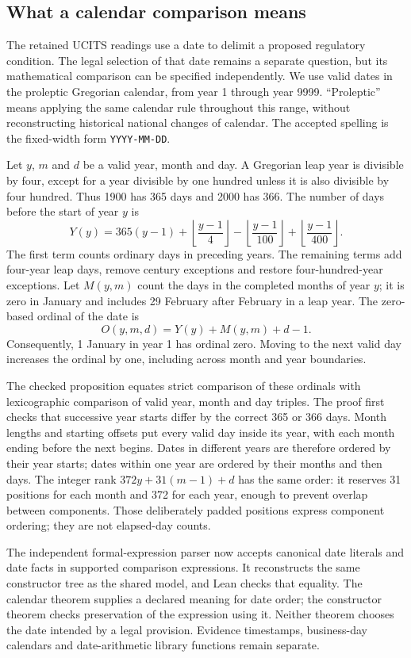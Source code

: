 \documentclass[12pt,a4paper,oneside,openany]{book}
\begin{document}
\subsection{What a calendar comparison means}

The retained UCITS readings use a date to delimit a proposed regulatory
condition. The legal selection of that date remains a separate question,
but its mathematical comparison can be specified independently. We use valid
dates in the proleptic Gregorian calendar, from year 1 through year 9999.
``Proleptic'' means applying the same calendar rule throughout this range,
without reconstructing historical national changes of calendar. The accepted
spelling is the fixed-width form \texttt{YYYY-MM-DD}.

Let $y$, $m$ and $d$ be a valid year, month and day. A Gregorian leap year is
divisible by four, except for a year divisible by one hundred unless it is
also divisible by four hundred. Thus 1900 has 365 days and 2000 has 366.
The number of days before the start of year $y$ is
\[
 Y(y)=365(y-1)
       +\left\lfloor\frac{y-1}{4}\right\rfloor
       -\left\lfloor\frac{y-1}{100}\right\rfloor
       +\left\lfloor\frac{y-1}{400}\right\rfloor.
\]
The first term counts ordinary days in preceding years. The remaining terms
add four-year leap days, remove century exceptions and restore four-hundred-year
exceptions. Let $M(y,m)$ count the days in the completed months of year $y$;
it is zero in January and includes 29 February after February in a leap year.
The zero-based ordinal of the date is
\[
 O(y,m,d)=Y(y)+M(y,m)+d-1.
\]
Consequently, 1 January in year 1 has ordinal zero. Moving to the next valid
day increases the ordinal by one, including across month and year boundaries.

The checked proposition equates strict comparison of these ordinals with
lexicographic comparison of valid year, month and day triples. The proof first
checks that successive year starts differ by the correct 365 or 366 days.
Month lengths and starting offsets put every valid day inside its year, with
each month ending before the next begins. Dates in different years are
therefore ordered by their year starts; dates within one year are ordered by
their months and then days. The integer rank $372y+31(m-1)+d$ has the same
order: it reserves 31 positions for each month and 372 for each year, enough
to prevent overlap between components. Those deliberately padded positions
express component ordering; they are not elapsed-day counts.

The independent formal-expression parser now accepts canonical date literals
and date facts in supported comparison expressions. It reconstructs the same
constructor tree as the shared model, and Lean checks that equality. The
calendar theorem supplies a declared meaning for date order; the constructor
theorem checks preservation of the expression using it. Neither theorem
chooses the date intended by a legal provision. Evidence timestamps,
business-day calendars and date-arithmetic library functions remain separate.
\end{document}
